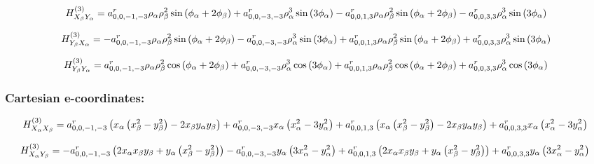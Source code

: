\documentclass[fleqn]{article}
\begin{document}
\begin{dmath*}
H_{X_{\beta}Y_{\alpha}}^{(3)}= a^{r}_{0,0,-1,-3} \rho_{\alpha} \rho_{\beta}^{2} \sin{\left (\phi_{\alpha} + 2 \phi_{\beta} \right )} +  a^{r}_{0,0,-3,-3} \rho_{\alpha}^{3} \sin{\left (3 \phi_{\alpha} \right )} -  a^{r}_{0,0,1,3} \rho_{\alpha} \rho_{\beta}^{2} \sin{\left (\phi_{\alpha} + 2 \phi_{\beta} \right )} -  a^{r}_{0,0,3,3} \rho_{\alpha}^{3} \sin{\left (3 \phi_{\alpha} \right )}\\
\end{dmath*}

\begin{dmath*}
H_{Y_{\beta}X_{\alpha}}^{(3)}=-  a^{r}_{0,0,-1,-3} \rho_{\alpha} \rho_{\beta}^{2} \sin{\left (\phi_{\alpha} + 2 \phi_{\beta} \right )} -  a^{r}_{0,0,-3,-3} \rho_{\alpha}^{3} \sin{\left (3 \phi_{\alpha} \right )} +  a^{r}_{0,0,1,3} \rho_{\alpha} \rho_{\beta}^{2} \sin{\left (\phi_{\alpha} + 2 \phi_{\beta} \right )} +  a^{r}_{0,0,3,3} \rho_{\alpha}^{3} \sin{\left (3 \phi_{\alpha} \right )}\\
\end{dmath*}

\begin{dmath*}
H_{Y_{\beta}Y_{\alpha}}^{(3)}= a^{r}_{0,0,-1,-3} \rho_{\alpha} \rho_{\beta}^{2} \cos{\left (\phi_{\alpha} + 2 \phi_{\beta} \right )} +  a^{r}_{0,0,-3,-3} \rho_{\alpha}^{3} \cos{\left (3 \phi_{\alpha} \right )} +  a^{r}_{0,0,1,3} \rho_{\alpha} \rho_{\beta}^{2} \cos{\left (\phi_{\alpha} + 2 \phi_{\beta} \right )} +  a^{r}_{0,0,3,3} \rho_{\alpha}^{3} \cos{\left (3 \phi_{\alpha} \right )}\\
\end{dmath*}
\subsubsection*{Cartesian e-coordinates:}

\begin{dmath*}
H_{X_{\alpha}X_{\beta}}^{(3)}=a^{r}_{0,0,-1,-3} \left(x_{\alpha} \left(x_{\beta}^{2} - y_{\beta}^{2}\right) - 2 x_{\beta} y_{\alpha} y_{\beta}\right) + a^{r}_{0,0,-3,-3} x_{\alpha} \left(x_{\alpha}^{2} - 3 y_{\alpha}^{2}\right) + a^{r}_{0,0,1,3} \left(x_{\alpha} \left(x_{\beta}^{2} - y_{\beta}^{2}\right) - 2 x_{\beta} y_{\alpha} y_{\beta}\right) + a^{r}_{0,0,3,3} x_{\alpha} \left(x_{\alpha}^{2} - 3 y_{\alpha}^{2}\right)\\
\end{dmath*}

\begin{dmath*}
H_{X_{\alpha}Y_{\beta}}^{(3)}=-  a^{r}_{0,0,-1,-3} \left(2 x_{\alpha} x_{\beta} y_{\beta} + y_{\alpha} \left(x_{\beta}^{2} - y_{\beta}^{2}\right)\right) -  a^{r}_{0,0,-3,-3} y_{\alpha} \left(3 x_{\alpha}^{2} - y_{\alpha}^{2}\right) +  a^{r}_{0,0,1,3} \left(2 x_{\alpha} x_{\beta} y_{\beta} + y_{\alpha} \left(x_{\beta}^{2} - y_{\beta}^{2}\right)\right) +  a^{r}_{0,0,3,3} y_{\alpha} \left(3 x_{\alpha}^{2} - y_{\alpha}^{2}\right)\\
\end{dmath*}
\end{document}
